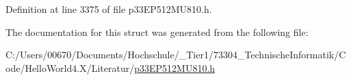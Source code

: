 Definition at line 3375 of file p33\+E\+P512\+M\+U810.\+h.



The documentation for this struct was generated from the following file\+:\begin{DoxyCompactItemize}
\item 
C\+:/\+Users/00670/\+Documents/\+Hochschule/\+\_\+\+Tier1/73304\+\_\+\+Technische\+Informatik/\+Code/\+Hello\+World4.\+X/\+Literatur/\hyperlink{p33_e_p512_m_u810_8h}{p33\+E\+P512\+M\+U810.\+h}\end{DoxyCompactItemize}
